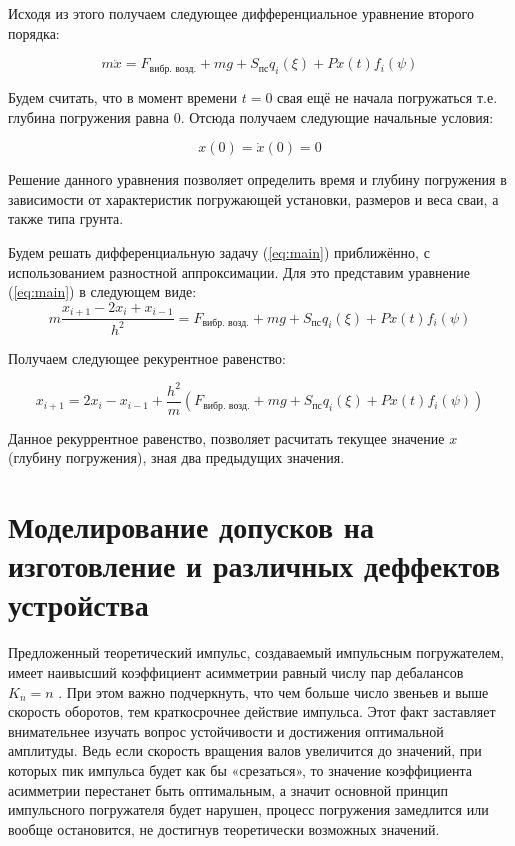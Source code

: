 \noindent Исходя из этого получаем следующее дифференциальное уравнение второго порядка:

\begin{equation}
    \label{eq:main}
    m\ddot{x} = F_\text{вибр. возд.} + mg + S_\text{пс} q_i(\xi) + P x(t) f_i(\psi)
\end{equation}

\noindent Будем считать, что в момент времени $t = 0$ свая ещё не начала погружаться т.е.
глубина погружения равна 0. Отсюда получаем следующие начальные условия:

\begin{equation}
    x(0) = \dot{x}(0) = 0
\end{equation}

Решение данного уравнения позволяет определить время и глубину погружения в зависимости от характеристик погружающей
установки, размеров и веса сваи, а также типа грунта.

Будем решать дифференциальную задачу (\ref{eq:main}) приближённо, с использованием разностной аппроксимации.
Для это представим уравнение (\ref{eq:main}) в следующем виде:
\begin{equation}
        m\frac{x_{i+1} - 2x_i + x_{i-1}}{h^2} = F_\text{вибр. возд.} + mg + S_\text{пс} q_i(\xi)+ P x(t) f_i(\psi)
\end{equation}

Получаем следующее рекурентное равенство:

\begin{equation}
    \label{eq:result}
    x_{i+1} = 2x_i - x_{i-1} + \frac{h^2}{m}(F_\text{вибр. возд.} + mg + S_\text{пс} q_i(\xi) + P x(t) f_i(\psi))
\end{equation}

\noindent Данное рекуррентное равенство, позволяет расчитать текущее значение $x$ (глубину погружения), зная два предыдущих значения.

\clearpage

\section{Моделирование допусков на изготовление и различных деффектов устройства}

Предложенный теоретический импульс, создаваемый импульсным погружателем, имеет наивысший
коэффициент асимметрии равный числу пар дебалансов $K_n=n$ \cite{kostin_va}. При этом важно подчеркнуть, что
чем больше число звеньев и выше скорость оборотов, тем краткосрочнее действие импульса. Этот факт заставляет
внимательнее изучать вопрос устойчивости и достижения оптимальной амплитуды. Ведь если скорость вращения валов
увеличится до значений, при которых пик импульса будет как бы «срезаться», то значение коэффициента асимметрии
перестанет быть оптимальным, а значит основной принцип импульсного погружателя будет нарушен, процесс погружения
замедлится или вообще остановится, не достигнув теоретически возможных значений.

